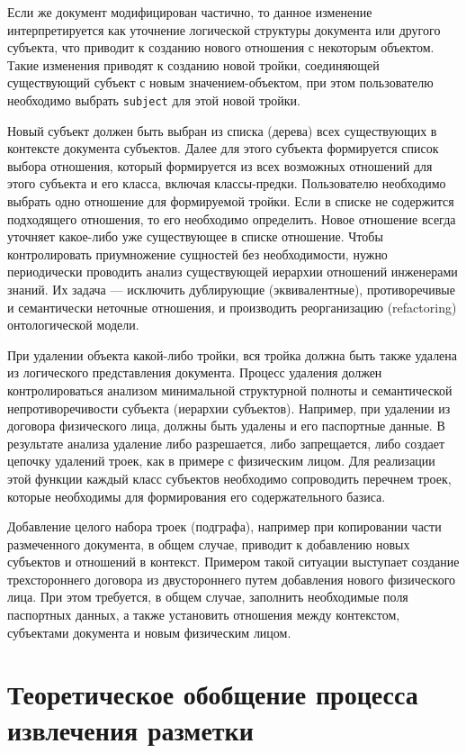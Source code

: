\documentclass[utf8]{../IncArticle}
\begin{document}
Если же документ модифицирован частично, то данное изменение
интерпретируется как уточнение логической структуры документа или
другого субъекта, что приводит к созданию нового отношения с некоторым объектом.
Такие изменения приводят к созданию новой тройки, соединяющей
существующий субъект с новым значением-объектом, при этом пользователю
необходимо выбрать \texttt{subject} для этой новой тройки.

Новый субъект должен быть выбран из списка (дерева) всех существующих
в контексте документа субъектов.  Далее для этого субъекта формируется
список выбора отношения, который формируется из всех возможных
отношений для этого субъекта и его класса, включая классы-предки.
Пользователю необходимо выбрать одно отношение для формируемой тройки.
Если в списке не содержится подходящего отношения, то его необходимо
определить.  Новое отношение всегда уточняет какое-либо уже
существующее в списке отношение.  Чтобы контролировать приумножение
сущностей без необходимости, нужно периодически проводить анализ
существующей иерархии отношений инженерами знаний.  Их задача ---
исключить дублирующие (эквивалентные), противоречивые и семантически
неточные отношения, и производить реорганизацию (refactoring)
онтологической модели.

При удалении объекта какой-либо тройки, вся тройка должна быть также
удалена из логического представления документа.  Процесс удаления
должен контролироваться анализом минимальной структурной полноты и
семантической непротиворечивости субъекта (иерархии субъектов).
Например, при удалении из договора физического лица, должны быть
удалены и его паспортные данные. В результате анализа удаление либо
разрешается, либо запрещается, либо создает цепочку удалений троек,
как в примере с физическим лицом.  Для реализации этой функции каждый
класс субъектов необходимо сопроводить перечнем троек, которые
необходимы для формирования его содержательного базиса.

Добавление целого набора троек (подграфа), например при копировании
части размеченного документа, в общем случае, приводит к
добавлению новых субъектов и отношений в контекст.  Примером такой
ситуации выступает создание трехстороннего договора из двустороннего
путем добавления нового физического лица.  При этом требуется, в
общем случае, заполнить необходимые поля паспортных данных, а также
установить отношения между контекстом, субъектами документа и новым
физическим лицом.

\section{Теоретическое обобщение процесса извлечения разметки}
\end{document}
